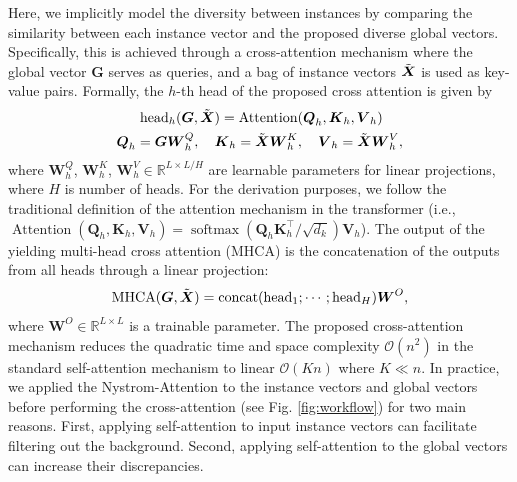 \documentclass[runningheads]{llncs}
\begin{document}
Here, we implicitly model the diversity between instances by comparing the similarity between each instance vector and the proposed diverse global vectors. Specifically, this is achieved through a cross-attention mechanism where the global vector $\boldsymbol{G}$ serves as queries, and a bag of instance vectors $\Tilde{\boldsymbol{X}}$ is used as key-value pairs. Formally, the $h$-th head of the proposed cross attention is given by
\begin{equation}
\begin{split}
    &  \ \ \ \ \ \text{head}_h(\boldsymbol{G}, \Tilde{\boldsymbol{X}}) = \operatorname{Attention}(\boldsymbol{Q}_h, \boldsymbol{K}_h, \boldsymbol{V}_h) \\
    & \boldsymbol{Q}_h = \boldsymbol{G} \boldsymbol{W}_h^{Q}, \ \ \ \boldsymbol{K}_h = \Tilde{\boldsymbol{X}} \boldsymbol{W}_h^{K}, \ \ \ \boldsymbol{V}_h = \Tilde{\boldsymbol{X}} \boldsymbol{W}_h^{V} ,
\end{split}
\end{equation}
where $\boldsymbol{W}^{Q}_h$, $\boldsymbol{W}^{K}_h$, $\boldsymbol{W}^{V}_h \in \mathbb{R}^{L \times L/H}$ are learnable parameters for linear projections, where $H$ is number of heads. For the derivation purposes, we follow the traditional definition of the attention mechanism in the transformer (i.e., $\operatorname{Attention}(\boldsymbol{Q}_h, \boldsymbol{K}_h, \boldsymbol{V}_h) = \operatorname{softmax}\left( \boldsymbol{Q}_h \boldsymbol{K}_h^{\top} / \sqrt{d_k} \right) \boldsymbol{V}_h$). The output of the yielding multi-head cross attention (MHCA) is the concatenation of the outputs from all heads through a linear projection: 
\begin{equation}
    \text{MHCA}(\boldsymbol{G}, \Tilde{\boldsymbol{X}}) = \operatorname{concat}(\text{head}_1; \cdots; \text{head}_H)\boldsymbol{W}^{O},
\label{eqn:mhca}
\end{equation}
where $\boldsymbol{W}^{O} \in \mathbb{R}^{L \times L}$ is a trainable parameter. The proposed cross-attention mechanism reduces the quadratic time and space complexity $\mathcal{O}(n^2)$ in the standard self-attention mechanism to linear $\mathcal{O}(Kn)$ where $K \ll n$. In practice, we applied the Nystrom-Attention to the instance vectors and global vectors before performing the cross-attention (see Fig. \ref{fig:workflow}) for two main reasons. First, applying self-attention to input instance vectors can facilitate filtering out the background. Second, applying self-attention to the global vectors can increase their discrepancies. 
\end{document}
